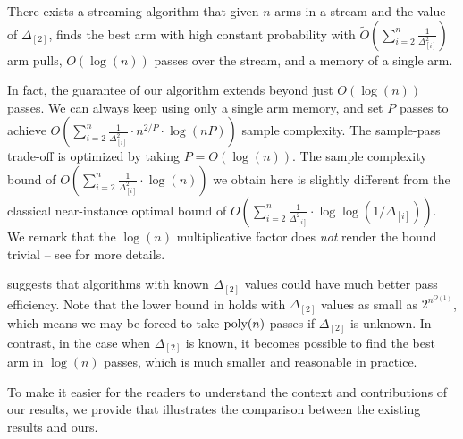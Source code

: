 \begin{result}
	\label{rst:main-ub}
	\vspace{-3pt}
	There exists a streaming algorithm that given $n$ arms in a stream and the value of $\Delta_{[2]}$, finds the best arm with high constant probability with $\tilde{O}(\sum_{i=2}^{n}\frac{1}{\Delta^2_{[i]}})$ arm pulls, $O(\log(n))$ passes over the stream, and a memory of a single arm.
\end{result}
In fact, the guarantee of our algorithm extends beyond just $O(\log(n))$ passes. We can always keep using only a single arm memory, and set $P$ passes to achieve $O(\sum_{i = 2}^n \frac{1}{\Delta^2_{[i]}} \cdot n^{2/P} \cdot \log \left({n P}\right))$ sample complexity. The sample-pass trade-off is optimized by taking $P=O(\log(n))$. The sample complexity bound of $O(\sum_{i=2}^{n}\frac{1}{\Delta^2_{[i]}}\cdot \log(n))$ we obtain here is slightly different from the classical near-instance optimal bound of $O(\sum_{i=2}^{n}\frac{1}{\Delta^2_{[i]}}\cdot \log\log{(1/\Delta_{[i]})})$. We remark that the $\log(n)$ multiplicative factor does \emph{not} render the bound trivial -- see  for more details.

 suggests that algorithms with known $\Delta_{[2]}$ values could have much better pass efficiency. Note that the lower bound in \cite{AW23BestArm} holds with $\Delta_{[2]}$ values as small as $2^{n^{O(1)}}$, which means we may be forced to take $\mbox{\rm poly}(n)$ passes if $\Delta_{[2]}$ is unknown. In contrast, in the case when $\Delta_{[2]}$ is known, it becomes possible to find the best arm in $\log(n)$ passes, which is much smaller and reasonable in practice.


To make it easier for the readers to understand the context and contributions of our results, we provide  that illustrates the comparison between the existing results and ours.

